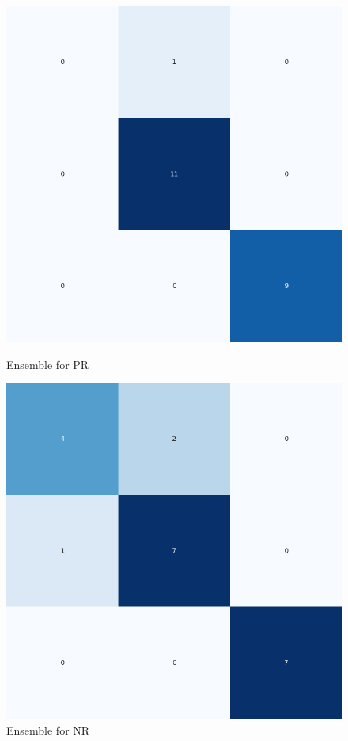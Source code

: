 \begin{figure}[H]
    \centering
    \begin{minipage}[b]{0.45\textwidth}
        \includegraphics[width=\textwidth]{./class_specific_section/ensemble_plots/ensemble_confusion_matrix_PR.png}
        \caption{Ensemble for PR}
        \label{fig_class:spec_ensemble_pr}
    \end{minipage}
    \hfill
    \begin{minipage}[b]{0.45\textwidth}
        \includegraphics[width=\textwidth]{./class_specific_section/ensemble_plots/ensemble_confusion_matrix_NR.png}
        \caption{Ensemble for NR}
        \label{fig_class:spec_ensemble_nr}
    \end{minipage}
\end{figure}

